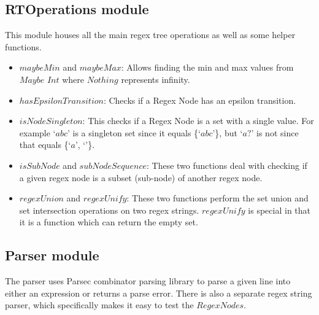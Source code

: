 \documentclass[letterpaper, 11pt]{article}
\begin{document}
\subsection{RTOperations module}\label{code:rtops}
This module houses all the main regex tree operations as well as some helper functions.
\begin{itemize}[itemsep=-0.3em]
    \item $maybeMin$ and $maybeMax$: Allows finding the min and max values from $Maybe$ $Int$ where $Nothing$ represents infinity.
    \item $hasEpsilonTransition$: Checks if a Regex Node has an epsilon transition.
    \item $isNodeSingleton$: This checks if a Regex Node is a set with a single value. For example `$abc$' is a singleton set since it equals \{`$abc$'\}, but `$a?$' is not since that equals \{`$a$', `$ $'\}.
    \item $isSubNode$ and $subNodeSequence$: These two functions deal with checking if a given regex node is a subset (sub-node) of another regex node.
    \item $regexUnion$ and $regexUnify$: These two functions perform the set union and set intersection operations on two regex strings. $regexUnify$ is special in that it is a function which can return the empty set.
\end{itemize}

\subsection{Parser module}\label{code:parse}
The parser uses Parsec combinator parsing library to parse a given line into either an expression or returns a parse error. 
There is also a separate regex string parser, which specifically makes it easy to test the $Regex Nodes$. 
\end{document}
